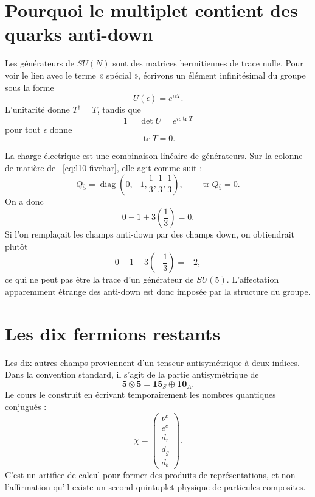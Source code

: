 \section{Pourquoi le multiplet contient des quarks anti-down}

Les générateurs de \(SU(N)\) sont des matrices hermitiennes de trace nulle. Pour voir le lien avec le terme « spécial », écrivons un élément infinitésimal du groupe sous la forme
\begin{equation}
U(\epsilon)=e^{i\epsilon T}.
\end{equation}
L’unitarité donne \(T^\dagger=T\), tandis que
\begin{equation}
1=\det U=e^{i\epsilon\operatorname{tr}T}
\end{equation}
pour tout \(\epsilon\) donne
\begin{equation}
\operatorname{tr}T=0.
\label{eq:l10-traceless-generator}
\end{equation}

La charge électrique est une combinaison linéaire de générateurs. Sur la colonne de matière de ~\eqref{eq:l10-fivebar}, elle agit comme suit :
\begin{equation}
Q_{\overline5}
=
\operatorname{diag}
\left(0,-1,\frac13,\frac13,\frac13\right),
\qquad
\operatorname{tr}Q_{\overline5}=0.
\label{eq:l10-charge-fivebar}
\end{equation}
On a donc
\begin{equation}
0-1+3\left(\frac13\right)=0.
\end{equation}
Si l’on remplaçait les champs anti-down par des champs down, on obtiendrait plutôt
\begin{equation}
0-1+3\left(-\frac13\right)=-2,
\end{equation}
ce qui ne peut pas être la trace d’un générateur de \(SU(5)\). L’affectation apparemment étrange des anti-down est donc imposée par la structure du groupe.

\section{Les dix fermions restants}

Les dix autres champs proviennent d’un tenseur antisymétrique à deux indices. Dans la convention standard, il s’agit de la partie antisymétrique de
\begin{equation}
\mathbf5\otimes\mathbf5
=\mathbf{15}_S\oplus\mathbf{10}_A.
\label{eq:l10-five-five}
\end{equation}
Le cours le construit en écrivant temporairement les nombres quantiques conjugués :
\begin{equation}
\chi=
\begin{pmatrix}
\nu^c\\
e^c\\
d_r\\
d_g\\
d_b
\end{pmatrix}.
\label{eq:l10-aux-five}
\end{equation}
C’est un artifice de calcul pour former des produits de représentations, et non l’affirmation qu’il existe un second quintuplet physique de particules composites.

